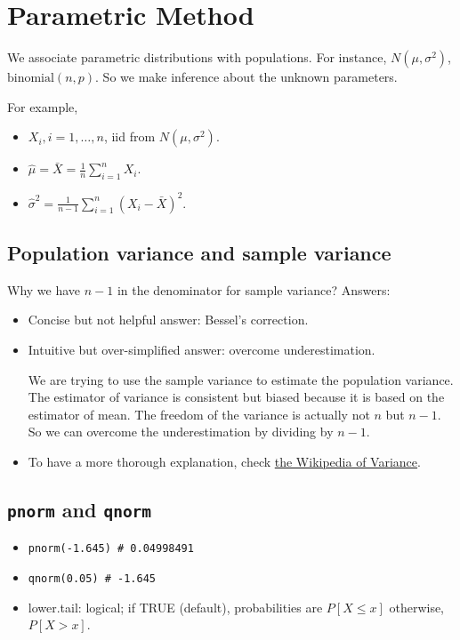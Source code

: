 \section{Parametric Method}
We associate parametric distributions with populations. For instance, $N(\mu, \sigma^2)$, $\text{binomial}(n, p)$. So we make inference about the unknown parameters.

For example,
\begin{itemize}
	\item $X_i, i = 1, \dots, n$, iid from $N(\mu, \sigma^2)$.
	\item $\hat{\mu} = \bar{X} = \frac{1}{n} \sum_{i=1}^{n}X_i$.
	\item $\hat{\sigma}^2 = \frac{1}{n-1} \sum_{i=1}^{n}(X_i - \bar{X})^2$.
\end{itemize}

\subsection{Population variance and sample variance}
Why we have $n-1$ in the denominator for sample variance?
Answers:
\begin{itemize}
	\item Concise but not helpful answer: Bessel's correction.
	\item Intuitive but over-simplified answer: overcome underestimation.
	
	We are trying to use the sample variance to estimate the population variance. The estimator of variance is consistent but biased because it is based on the estimator of mean. The freedom of the variance is actually not $n$ but $n-1$. So we can overcome the underestimation by dividing by $n-1$.
	\item To have a more thorough explanation, check \href{https://en.wikipedia.org/wiki/Variance#Population_variance_and_sample_variance}{the Wikipedia of Variance}.
\end{itemize}

\subsection{\texttt{pnorm} and \texttt{qnorm}}
\begin{itemize}
	\item \texttt{pnorm(-1.645) \# 0.04998491}
	\item \texttt{qnorm(0.05) \# -1.645}
	\item lower.tail: logical; if TRUE (default), probabilities are $P[X \le x]$ otherwise,
$P[X > x]$.
\end{itemize}

